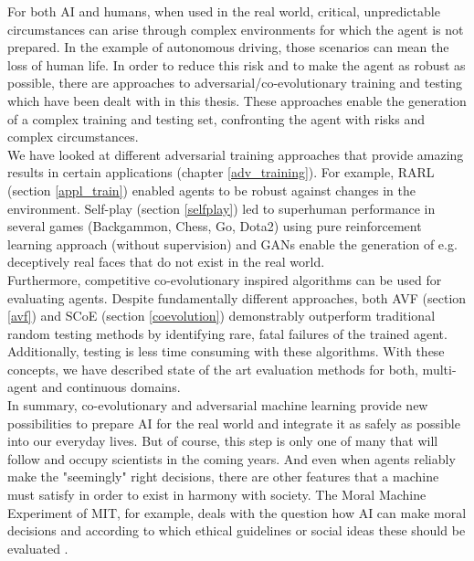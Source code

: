 For both AI and humans, when used in the real world, critical, unpredictable circumstances can arise through complex environments for which the agent is not prepared. In the example of autonomous driving, those scenarios can mean the loss of human life. In order to reduce this risk and to make the agent as robust as possible, there are approaches to adversarial/co-evolutionary training and testing which have been dealt with in this thesis. These approaches enable the generation of a complex training and testing set, confronting the agent with risks and complex circumstances.\\
We have looked at different adversarial training approaches that provide amazing results in certain applications (chapter \ref{adv_training}). For example, RARL (section \ref{appl_train}) enabled agents to be robust against changes in the environment. Self-play (section \ref{selfplay}) led to superhuman performance in several games (Backgammon, Chess, Go, Dota2) using pure reinforcement learning approach (without supervision) and GANs enable the generation of e.g. deceptively real faces that do not exist in the real world.\\
Furthermore, competitive co-evolutionary inspired algorithms can be used for evaluating agents. Despite fundamentally different approaches, both AVF (section \ref{avf}) and SCoE (section \ref{coevolution}) demonstrably outperform traditional random testing methods by identifying rare, fatal failures of the trained agent. Additionally, testing is less time consuming with these algorithms. With these concepts, we have described state of the art evaluation methods for both, multi-agent and continuous domains.\\
In summary, co-evolutionary and adversarial machine learning provide new possibilities to prepare AI for the real world and integrate it as safely as possible into our everyday lives. But of course, this step is only one of many that will follow and occupy scientists in the coming years. And even when agents reliably make the "seemingly" right decisions, there are other features that a machine must satisfy in order to exist in harmony with society. The Moral Machine Experiment of MIT, for example, deals with the question how AI can make moral decisions and according to which ethical guidelines or social ideas these should be evaluated \cite{awad2018moral}.